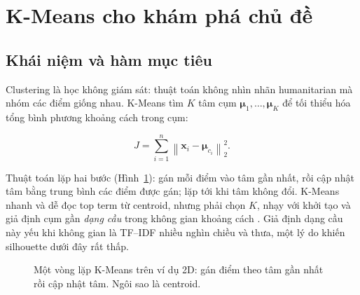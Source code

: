 \section{K-Means cho khám phá chủ đề}

\subsection{Khái niệm và hàm mục tiêu}

Clustering là học không giám sát: thuật toán không nhìn nhãn humanitarian mà
nhóm các điểm giống nhau. K-Means tìm \(K\) tâm cụm
\(\boldsymbol{\mu}_1,\ldots,\boldsymbol{\mu}_K\) để tối thiểu hóa tổng bình
phương khoảng cách trong cụm:

\[
J=\sum_{i=1}^{n}
\left\|\mathbf{x}_i-\boldsymbol{\mu}_{c_i}\right\|_2^2.
\]

Thuật toán lặp hai bước (Hình~\ref{fig:kmeans-iter}): gán mỗi điểm vào tâm gần
nhất, rồi cập nhật tâm bằng trung bình các điểm được gán; lặp tới khi tâm không
đổi. K-Means nhanh và dễ đọc top term từ centroid, nhưng phải chọn \(K\), nhạy
với khởi tạo và giả định cụm gần \emph{dạng cầu} trong không gian khoảng cách
\cite{macqueen1967}. Giả định dạng cầu này yếu khi không gian là TF--IDF nhiều
nghìn chiều và thưa, một lý do khiến silhouette dưới đây rất thấp.

\begin{figure}[H]
\centering
{}
\caption{Một vòng lặp K-Means trên ví dụ 2D: gán điểm theo tâm gần nhất rồi cập
nhật tâm. Ngôi sao là centroid.}
\label{fig:kmeans-iter}
\end{figure}


